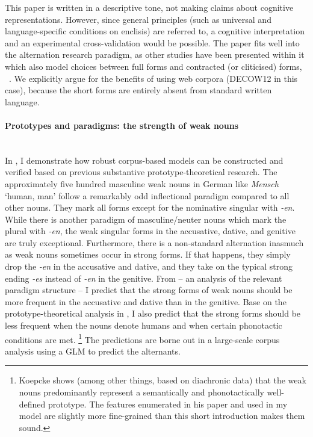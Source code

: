 This paper is written in a descriptive tone, not making claims about cognitive representations.
However, since general principles (such as universal and language-specific conditions on enclisis) are referred to, a cognitive interpretation and an experimental cross-validation would be possible.
The paper fits well into the alternation research paradigm, as other studies have been presented within it which also model choices between full forms and contracted (or cliticised) forms, \eg\ \citet{BarthKapatsinski2014}.
We explicitly argue for the benefits of using web corpora (DECOW12 in this case), because the short forms are entirely absent from standard written language.

\paragraph[Prototypes and paradigms]{Prototypes and paradigms: the strength of weak nouns}
\mbox{}\\[0.5\baselineskip]\noindent
In \ROWeakN, I demonstrate how robust corpus-based models can be constructed and verified based on previous substantive prototype-theoretical research.
The approximately five hundred masculine weak nouns in German like \textit{Mensch} `human, man' follow a remarkably odd inflectional paradigm compared to all other nouns.
They mark all forms except for the nominative singular with \textit{-en}.
While there is another paradigm of masculine\slash neuter nouns which mark the plural with \textit{-en}, the weak singular forms in the accusative, dative, and genitive are truly exceptional.
Furthermore, there is a non-standard alternation inasmuch as weak nouns sometimes occur in strong forms.
If that happens, they simply drop the \textit{-en} in the accusative and dative, and they take on the typical strong ending \textit{-es} instead of \textit{-en} in the genitive.
From \citet{Thieroff2003} -- an analysis of the relevant paradigm structure -- I predict that the strong forms of weak nouns should be more frequent in the accusative and dative than in the genitive.
Base on the prototype-theoretical analysis in \citet{Koepcke1995}, I also predict that the strong forms should be less frequent when the nouns denote humans and when certain phonotactic conditions are met.%
\footnote{Koepcke shows (among other things, based on diachronic data) that the weak nouns predominantly represent a semantically and phonotactically well-defined prototype.
The features enumerated in his paper and used in my model are slightly more fine-grained than this short introduction makes them sound.}
The predictions are borne out in a large-scale corpus analysis using a GLM to predict the alternants.

